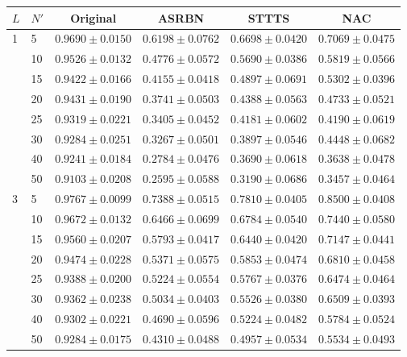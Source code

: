 \documentclass[12pt,leqno,a4paper]{article}
\begin{document}
\begin{table}[H]
\centering
\scriptsize
\setlength{\tabcolsep}{3pt}
\renewcommand{\arraystretch}{0.90}
\begin{tabular}{llcccc}
\hline
$L$ & $N'$ & Original & ASRBN & STTTS & NAC \\
\hline
1 & 5  & $0.9690 \pm 0.0150$ & $0.6198 \pm 0.0762$ 
        & $0.6698 \pm 0.0420$ & $0.7069 \pm 0.0475$ \\
  & 10 & $0.9526 \pm 0.0132$ & $0.4776 \pm 0.0572$ 
        & $0.5690 \pm 0.0386$ & $0.5819 \pm 0.0566$ \\
  & 15 & $0.9422 \pm 0.0166$ & $0.4155 \pm 0.0418$ 
        & $0.4897 \pm 0.0691$ & $0.5302 \pm 0.0396$ \\
  & 20 & $0.9431 \pm 0.0190$ & $0.3741 \pm 0.0503$ 
        & $0.4388 \pm 0.0563$ & $0.4733 \pm 0.0521$ \\
  & 25 & $0.9319 \pm 0.0221$ & $0.3405 \pm 0.0452$ 
        & $0.4181 \pm 0.0602$ & $0.4190 \pm 0.0619$ \\
  & 30 & $0.9284 \pm 0.0251$ & $0.3267 \pm 0.0501$ 
        & $0.3897 \pm 0.0546$ & $0.4448 \pm 0.0682$ \\
  & 40 & $0.9241 \pm 0.0184$ & $0.2784 \pm 0.0476$ 
        & $0.3690 \pm 0.0618$ & $0.3638 \pm 0.0478$ \\
  & 50 & $0.9103 \pm 0.0208$ & $0.2595 \pm 0.0588$ 
        & $0.3190 \pm 0.0686$ & $0.3457 \pm 0.0464$ \\
\hline
3 & 5  & $0.9767 \pm 0.0099$ & $0.7388 \pm 0.0515$ 
        & $0.7810 \pm 0.0405$ & $0.8500 \pm 0.0408$ \\
  & 10 & $0.9672 \pm 0.0132$ & $0.6466 \pm 0.0699$ 
        & $0.6784 \pm 0.0540$ & $0.7440 \pm 0.0580$ \\
  & 15 & $0.9560 \pm 0.0207$ & $0.5793 \pm 0.0417$ 
        & $0.6440 \pm 0.0420$ & $0.7147 \pm 0.0441$ \\
  & 20 & $0.9474 \pm 0.0228$ & $0.5371 \pm 0.0575$ 
        & $0.5853 \pm 0.0474$ & $0.6810 \pm 0.0458$ \\
  & 25 & $0.9388 \pm 0.0200$ & $0.5224 \pm 0.0554$ 
        & $0.5767 \pm 0.0376$ & $0.6474 \pm 0.0464$ \\
  & 30 & $0.9362 \pm 0.0238$ & $0.5034 \pm 0.0403$ 
        & $0.5526 \pm 0.0380$ & $0.6509 \pm 0.0393$ \\
  & 40 & $0.9302 \pm 0.0221$ & $0.4690 \pm 0.0596$ 
        & $0.5224 \pm 0.0482$ & $0.5784 \pm 0.0524$ \\
  & 50 & $0.9284 \pm 0.0175$ & $0.4310 \pm 0.0488$ 
        & $0.4957 \pm 0.0534$ & $0.5534 \pm 0.0493$ \\

\end{tabular}
\end{table}
\end{document}
